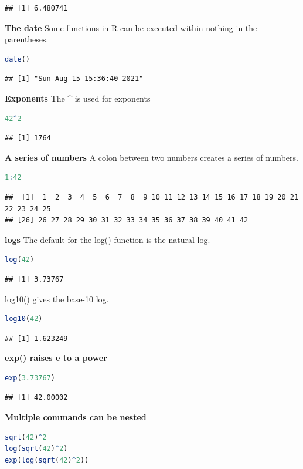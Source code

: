 \documentclass[
]{book}
\begin{document}
\begin{lstlisting}
## [1] 6.480741
\end{lstlisting}

\textbf{The date}
Some functions in R can be executed within nothing in the parentheses.

\begin{lstlisting}[language=R]
date()
\end{lstlisting}

\begin{lstlisting}
## [1] "Sun Aug 15 15:36:40 2021"
\end{lstlisting}

\textbf{Exponents}
The \textbf{\^{}} is used for exponents

\begin{lstlisting}[language=R]
42^2
\end{lstlisting}

\begin{lstlisting}
## [1] 1764
\end{lstlisting}

\textbf{A series of numbers}
A colon between two numbers creates a series of numbers.

\begin{lstlisting}[language=R]
1:42
\end{lstlisting}

\begin{lstlisting}
##  [1]  1  2  3  4  5  6  7  8  9 10 11 12 13 14 15 16 17 18 19 20 21 22 23 24 25
## [26] 26 27 28 29 30 31 32 33 34 35 36 37 38 39 40 41 42
\end{lstlisting}

\textbf{logs}
The default for the log() function is the natural log.

\begin{lstlisting}[language=R]
log(42)
\end{lstlisting}

\begin{lstlisting}
## [1] 3.73767
\end{lstlisting}

log10() gives the base-10 log.

\begin{lstlisting}[language=R]
log10(42)
\end{lstlisting}

\begin{lstlisting}
## [1] 1.623249
\end{lstlisting}

\textbf{exp() raises e to a power}

\begin{lstlisting}[language=R]
exp(3.73767)
\end{lstlisting}

\begin{lstlisting}
## [1] 42.00002
\end{lstlisting}

\textbf{Multiple commands can be nested}

\begin{lstlisting}[language=R]
sqrt(42)^2
log(sqrt(42)^2)
exp(log(sqrt(42)^2))
\end{lstlisting}

  
\end{document}
